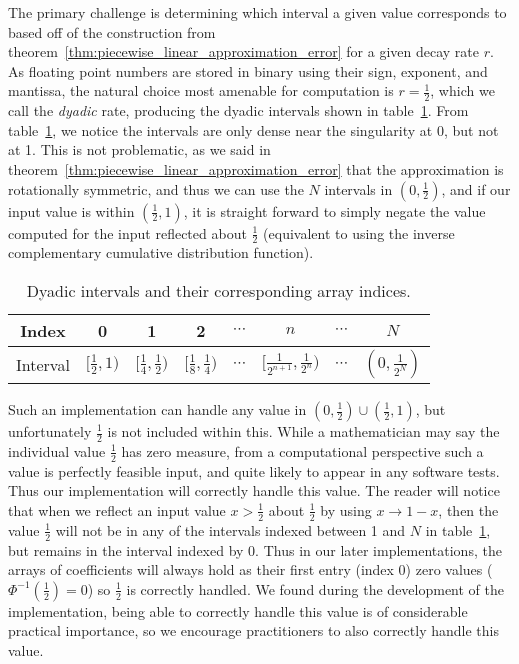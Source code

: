 \documentclass[manuscript,review]{acmart}
\begin{document}
The primary challenge is determining which interval a given value corresponds to based off of the construction from theorem~\ref{thm:piecewise_linear_approximation_error} for a given decay rate $ r $. As floating point numbers are stored in binary using their sign, exponent, and mantissa, the natural choice most amenable for computation is $ r = \tfrac{1}{2} $, which we call the \emph{dyadic} rate, producing the dyadic intervals shown in table~\ref{tab:dyadic_intervals}. From table~\ref{tab:dyadic_intervals}, we notice the intervals are only dense near the singularity at 0, but not at 1. This is not problematic, as we said in theorem~\ref{thm:piecewise_linear_approximation_error} that the approximation is rotationally symmetric, and thus we can use the $ N $ intervals in $ (0, \tfrac{1}{2}) $, and if our input value is within $ (\tfrac{1}{2}, 1) $, it is straight forward to simply negate the value computed for the input reflected about $ \tfrac{1}{2} $ (equivalent to using the inverse complementary cumulative distribution function). 

\begin{table}[htb]
\centering
\caption{Dyadic intervals and their corresponding array indices.}
\label{tab:dyadic_intervals}
\renewcommand{\arraystretch}{1.4}  %
\begin{tabular}{c|ccccccc}
Index & 0 & 1 & 2 & $ \cdots $ & $ n $ & $ \cdots $ & $ N $ \\ \hline
Interval & $ [\tfrac{1}{2}, 1) $ & $ [\tfrac{1}{4}, \tfrac{1}{2}) $ & $ [\tfrac{1}{8}, \tfrac{1}{4}) $ & $ \cdots $ & $ [\tfrac{1}{2^{n+1}}, \tfrac{1}{2^n}) $ & $ \cdots $ & $ (0, \tfrac{1}{2^N}) $
\end{tabular}
\end{table}

Such an implementation can handle any value in $ (0, \tfrac{1}{2}) \cup (\tfrac{1}{2}, 1) $, but unfortunately $ \tfrac{1}{2} $ is not included within this. While a mathematician may say the individual value $ \tfrac{1}{2} $ has zero measure, from a computational perspective such a value is perfectly feasible input, and quite likely to appear in any software tests. Thus our implementation will correctly handle this value. The reader will notice that when we reflect an input value $ x > \tfrac{1}{2} $ about $ \tfrac{1}{2} $ by using $ x \to 1 - x $, then the value $ \tfrac{1}{2} $ will not be in any of the intervals indexed between 1 and $ N $ in table~\ref{tab:dyadic_intervals}, but remains in the interval indexed by 0. Thus in our later implementations, the arrays of coefficients will always hold as their first entry (index 0) zero values ($ \Phi^{-1}(\tfrac{1}{2}) = 0 $) so $ \tfrac{1}{2} $ is correctly handled. We found during the development of the implementation, being able to correctly handle this value is of considerable practical importance, so we encourage practitioners to also correctly handle this value. 
\end{document}

